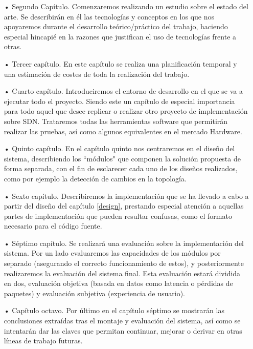 \documentclass[a4paper,11pt]{book}
\begin{document}
\begin{itemize}
\item[•] Segundo Capítulo. Comenzaremos realizando un estudio sobre el estado del arte. Se describirán en él las tecnologías y conceptos en los que nos apoyaremos durante el desarrollo teórico/práctico del trabajo, haciendo especial hincapié en la razones que justifican el uso de tecnologías frente a otras.

\item[•] Tercer capítulo. En este capítulo se realiza una planificación temporal y una estimación de costes de toda la realización del trabajo.

\item[•] Cuarto capítulo. Introduciremos el entorno de desarrollo en el que se va a ejecutar todo el proyecto. Siendo este un capítulo de especial importancia para todo aquel que desee replicar o realizar otro proyecto de implementación sobre \ac{SDN}. Trataremos todas las herramientas software que permitirán realizar las pruebas, así como algunos equivalentes en el mercado Hardware.

\item[•] Quinto capítulo. En el capítulo quinto nos centraremos en el diseño del sistema, describiendo los ``módulos" que componen la solución propuesta de forma separada, con el fin de esclarecer cada uno de los diseños realizados, como por ejemplo la detección de cambios en la topología.

\item[•] Sexto capítulo. Describiremos la implementación que se ha llevado a cabo a partir del diseño del capítulo \ref{design}, prestando especial atención a aquellas partes de implementación que pueden resultar confusas, como el formato necesario para el código fuente.

\item[•] Séptimo capítulo. Se realizará una evaluación sobre la implementación del sistema. Por un lado evaluaremos las capacidades de los módulos por separado (asegurando el correcto funcionamiento de estos), y posteriormente realizaremos la evaluación del sistema final. Esta evaluación estará dividida en dos, evaluación objetiva (basada en datos como latencia o pérdidas de paquetes) y evaluación subjetiva (experiencia de usuario).

\item[•] Capítulo octavo. Por último en el capítulo séptimo se mostrarán las conclusiones extraídas tras el montaje y evaluación del sistema, así como se intentarán dar las claves que permitan continuar, mejorar o derivar en otras líneas de trabajo futuras.
\end{itemize}
\end{document}
